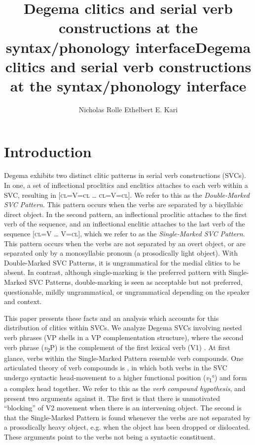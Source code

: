 \documentclass[output=paper]{langsci/langscibook}
\title{Degema clitics and serial verb constructions at the syntax/phonology interface}
\author{%
 Nicholas Rolle\affiliation{University of California, Berkeley}\lastand 
 Ethelbert E. Kari \affiliation{University of Botswana / University of Port Harcourt}
}
\begin{document}
\title{Degema clitics and serial verb constructions at the syntax/phonology interface}
 



 


\section{Introduction}

Degema exhibits two distinct clitic patterns in serial verb constructions (SVCs). In one, a set of inflectional proclitics and enclitics attaches to each verb within a SVC, resulting in [\textsc{cl=}V\textsc{=cl} … \textsc{cl=}V\textsc{=cl}]. We refer to this as the \textit{Double-Marked SVC Pattern}. This pattern occurs when the verbs are separated by a bisyllabic direct object. In the second pattern, an inflectional proclitic attaches to the first verb of the sequence, and an inflectional enclitic attaches to the last verb of the sequence [\textsc{cl=}V … V\textsc{=cl}], which we refer to as the \textit{Single-Marked SVC Pattern}. This pattern occurs when the verbs are not separated by an overt object, or are separated only by a monosyllabic pronoun (a prosodically light object). With Double-Marked SVC Patterns, it is ungrammatical for the medial clitics to be absent. In contrast, although single-marking is the preferred pattern with Single-Marked SVC Patterns, double-marking is seen as acceptable but not preferred, questionable, mildly ungrammatical, or ungrammatical depending on the speaker and context. 

This paper presents these facts and an analysis which accounts for this distribution of clitics within SVCs. We analyze Degema SVCs involving nested verb phrases (VP shells in a VP complementation structure), where the second verb phrase (\textit{v}\textsubscript{2}P) is the complement of the first lexical verb (V1) \citep{Collins1997,Collins2002}. At first glance, verbs within the Single-Marked Pattern resemble verb compounds. One articulated theory of verb compounds is \citet{Collins2002}, in which both verbs in the SVC undergo syntactic head-movement to a higher functional position (\textit{v}\textsubscript{1}°) and form a complex head together. We refer to this as the \textit{verb compound hypothesis}, and present two arguments against it. The first is that there is unmotivated “blocking” of V2 movement when there is an intervening object. The second is that the Single-Marked Pattern is found whenever the verbs are not separated by a prosodically heavy object, e.g. when the object has been dropped or dislocated. These arguments point to the verbs not being a syntactic constituent. 
\end{document}

